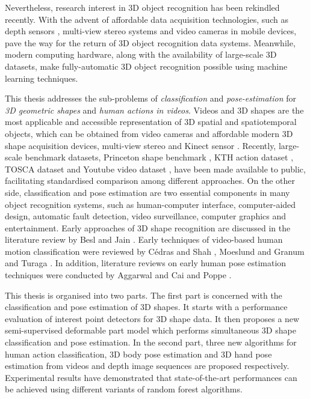 Nevertheless, research interest in 3D object recognition has been rekindled recently. 
With the advent of affordable data acquisition technologies, such as depth sensors \cite{Shotton2011}, multi-view stereo systems \cite{Vogiatzis2011} and video cameras in mobile devices, pave the way for the return of 3D object recognition data systems. 
Meanwhile, modern computing hardware, along with the availability of large-scale 3D datasets, make fully-automatic 3D object recognition possible using machine learning techniques.  

This thesis addresses the sub-problems of \emph{classification} and \emph{pose-estimation} for \emph{3D geometric shapes} and \emph{human actions in videos}. 
Videos and 3D shapes are the most applicable and accessible representation of 3D spatial and spatiotemporal objects, which can be obtained from video cameras and affordable modern 3D shape acquisition devices, \eg multi-view stereo \cite{Vogiatzis2011} and Kinect sensor \cite{Shotton2011}. 
Recently, large-scale benchmark datasets, \eg Princeton shape benchmark \cite{Shilane2004},  KTH action dataset \cite{Schuldt2004}, TOSCA dataset \cite{Bronstein2011} and Youtube video dataset \cite{Liu2009}, have been made available to public, facilitating standardised comparison among different approaches. 
On the other side, classification and pose estimation are two essential components in many object recognition systems, such as human-computer interface, computer-aided design, automatic fault detection, video surveillance, computer graphics and entertainment. 
Early approaches of 3D shape recognition are discussed in the literature review by Besl and Jain \cite{Besl1985}. Early techniques of video-based human motion classification were reviewed by C\'edras and Shah \cite{Cedras1995}, Moeslund and Granum \cite{Moeslund2001} and Turaga \etal \cite{Turaga2008}. In addition, literature reviews on early human pose estimation techniques were conducted by Aggarwal and Cai \cite{Aggarwal1999} and Poppe \cite{Poppe2007}.  

This thesis is organised into two parts.  
The first part is concerned with the classification and pose estimation of 3D shapes. It starts with a performance evaluation of interest point detectors for 3D shape data. It then proposes a new semi-supervised deformable part model which performs simultaneous 3D shape classification and pose estimation. In the second part, three new algorithms for human action classification, 3D body pose estimation and 3D hand pose estimation from videos and depth image sequences are proposed respectively. Experimental results have demonstrated that state-of-the-art performances can be achieved using different variants of random forest algorithms.  

